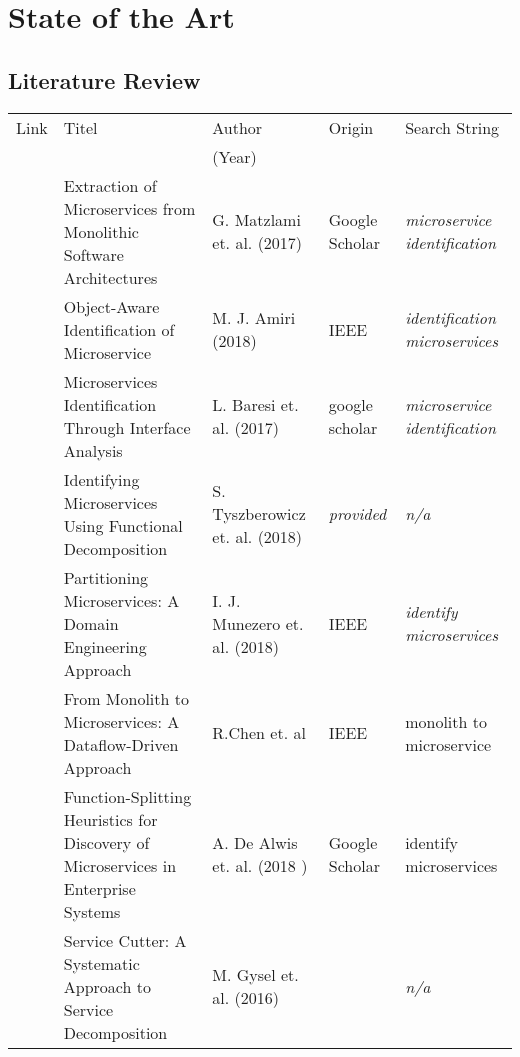 

\chapter{State of the Art}
\label{ch:StateOfTheArt}

\section{Literature Review}
\label{sec:StateOfTheArt:LiteratureReview}

\begin{table}[!h]
\centering
     
	
	\begin{tabularx}{\linewidth}{lXXlX}
		\rowcolor{gray!50}
		Link & Titel & Author   & Origin & Search String  \\
		
		\rowcolor{gray!50}
		& & (Year) & & \\
		
		\cite{ExtractionMazlami} & Extraction of Microservices from Monolithic Software Architectures  & G. Matzlami et. al. (2017) & Google Scholar&  {\itshape microservice identification }  \\
		
		
		\cite{ObjectAwareAmiri} & Object-Aware Identification of Microservice & M. J. Amiri (2018) & IEEE & \textit{identification microservices}\\\
		
		\cite{interfaceAnalysisBaresi} & Microservices Identification Through Interface Analysis & L. Baresi et. al. (2017)& google scholar & \textit{microservice identification}\\
		
		
		
		 
		 \cite{FunctionalDecompositionHeinrich}& Identifying Microservices Using Functional Decomposition & S. Tyszberowicz et. al. (2018) & \textit{provided} & \textit{n/a} \\
		 
		 \cite{DomainEngineeringMunezero} & Partitioning Microservices: A Domain Engineering Approach & I. J. Munezero et. al. (2018) & IEEE & \textit{identify microservices}\\
		 
		 
		 \cite{DataflowDrivenChen} & From Monolith to Microservices: A Dataflow-Driven Approach & R.Chen et. al & IEEE & monolith to microservice \\
		 
		\cite{HeuristicsAlwis} & Function-Splitting Heuristics for Discovery of Microservices in Enterprise Systems & A. De Alwis et. al. (2018 )& Google Scholar & identify microservices \\
		
	\cite{ServiceCutter} & 	Service Cutter: A Systematic Approach to Service Decomposition& M. Gysel et. al. (2016) & \cite{interfaceAnalysisBaresi} & \textit{n/a} \\
	\end{tabularx}
	
\end{table}

